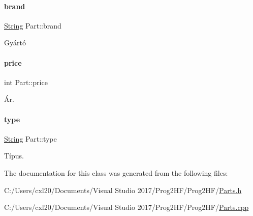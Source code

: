 \paragraph{\texorpdfstring{brand}{brand}}
{\footnotesize\ttfamily \mbox{\hyperlink{class_string}{String}} Part\+::brand\hspace{0.3cm}{\ttfamily [protected]}}



Gyártó 

\mbox{\label{class_part_a8e71223aed1da95a974f33d8d6c91bb1}} 
\paragraph{\texorpdfstring{price}{price}}
{\footnotesize\ttfamily int Part\+::price\hspace{0.3cm}{\ttfamily [protected]}}



Ár. 

\mbox{\label{class_part_a101dbcc5c4b21564df7414c7eb0eae88}} 
\paragraph{\texorpdfstring{type}{type}}
{\footnotesize\ttfamily \mbox{\hyperlink{class_string}{String}} Part\+::type\hspace{0.3cm}{\ttfamily [protected]}}



Típus. 



The documentation for this class was generated from the following files\+:\begin{DoxyCompactItemize}
\item 
C\+:/\+Users/cxl20/\+Documents/\+Visual Studio 2017/\+Prog2\+H\+F/\+Prog2\+H\+F/\mbox{\hyperlink{_parts_8h}{Parts.\+h}}\item 
C\+:/\+Users/cxl20/\+Documents/\+Visual Studio 2017/\+Prog2\+H\+F/\+Prog2\+H\+F/\mbox{\hyperlink{_parts_8cpp}{Parts.\+cpp}}\end{DoxyCompactItemize}
